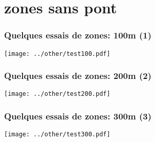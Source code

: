 \documentclass[aspectratio=169]{beamer}
\begin{document}
    \section{zones sans pont}
    \begin{frame}
        \frametitle{Quelques essais de zones: 100m (1)}
        \texttt{[image: ../other/test100.pdf]}
    \end{frame}

    \begin{frame}
        \frametitle{Quelques essais de zones: 200m (2)}
        \texttt{[image: ../other/test200.pdf]}
    \end{frame}

    \begin{frame}
        \frametitle{Quelques essais de zones: 300m (3)}
        \texttt{[image: ../other/test300.pdf]}
    \end{frame}

    
\end{document}
